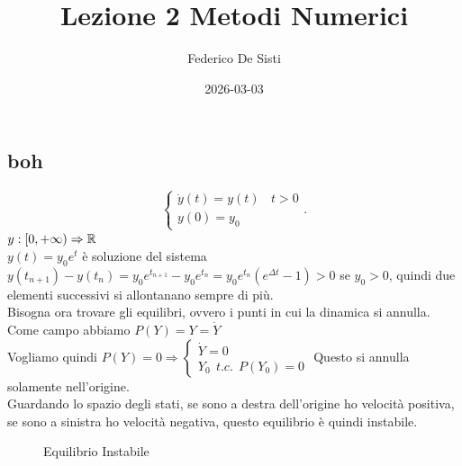 \documentclass[12px]{article}
\title{Lezione 2 Metodi Numerici}
\date{2026-03-03}
\author{Federico De Sisti}
\begin{document}
	\maketitle
	\newpage
	\subsection{boh}
	\[
	\begin{cases}
		\dot y(t) = y(t)\ \ \ \ t > 0 \\
		y(0) = y_0
	\end{cases}
	.\] 
	$y:[0,+\infty) \Rightarrow \mathbb{R}$ \\
	$y(t) = y_0e^t$ è soluzione del sistema\\
	$y(t_{n+1}) - y(t_n) = y_0e^{t_{n+1}} - y_0e^{t_n} = y_0e^{t_n}(e^{\Delta t} - 1)> 0$ se $y_0 > 0$, quindi due elementi successivi si allontanano sempre di più.\\
	Bisogna ora trovare gli equilibri, ovvero i punti in cui la dinamica si annulla.\\
	Come campo abbiamo $P(Y) = Y = \dot Y$\\
	Vogliamo quindi  $P(Y) = 0 \Rightarrow \begin{cases}
		\dot Y = 0\\
		Y_0 \ \ t.c.\ \  P(Y_0) = 0
	\end{cases}$ 
	Questo si annulla solamente nell'origine.\\
	Guardando lo spazio degli stati, se sono a destra dell'origine ho velocità positiva, se sono a sinistra ho velocità negativa, questo equilibrio è quindi instabile.\\
\begin{figure}[h]
    \centering
    \caption{Equilibrio Instabile}
\end{figure}
\end{document}

